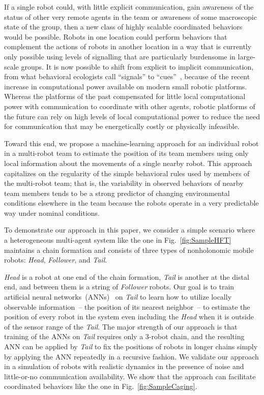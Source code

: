 \documentclass[letterpaper, 10 pt, conference]{ieeeconf}  %
\begin{document}
	If a single robot could, with little explicit communication, gain
	awareness of the status of other very remote agents in the team or
	awareness of some macroscopic state of the group, then a new class of
	highly scalable coordinated behaviors would be possible. Robots in one
	location could perform behaviors that complement the actions of robots
	in another location in a way that is currently only possible using
	levels of signalling that are particularly burdensome in large-scale
	groups. It is now possible to shift from explicit to implicit
	communication, from what behavioral ecologists call ``signals'' to
	``cues''~\cite{BV11}, because of the recent increase in computational
	power available on modern small robotic platforms. Whereas the platforms
	of the past compensated for little local computational power with
	communication to coordinate with other agents, robotic platforms of the
	future can rely on high levels of local computational power to reduce
	the need for communication that may be energetically costly or
	physically infeasible.
	
	Toward this end, we propose a machine-learning approach for an
	individual robot in a multi-robot team to estimate the position of its
	team members using only local information about the movements of a
	single nearby robot. This approach capitalizes on the regularity of the
	simple behavioral rules used by members of the multi-robot team; that
	is, the variability in observed behaviors of nearby team members tends
	to be a strong predictor of changing environmental conditions elsewhere
	in the team because the robots operate in a very predictable way under
	nominal conditions.
	
	To demonstrate our approach in this paper, we consider a simple scenario
	where a heterogeneous multi-agent system like the one in
	Fig.~\ref{fig:SampleHFT} maintains a chain
	formation and consists of three types of nonholonomic mobile robots:
	\emph{Head}, \emph{Follower}, and \emph{Tail}.
	
	\emph{Head} is a robot at one end of the chain formation, \emph{Tail} is
	another at the distal end, and between them is a string of
	\emph{Follower} robots. Our goal is to train artificial neural
	networks~(ANNs)~\cite{Schmidhuber15} on \emph{Tail} to learn how to
	utilize locally observable information~-- the position of its nearest
	neighbor~-- to estimate the position of every robot in the system even
	including the \emph{Head} when it is outside of the sensor range of the
	\emph{Tail}. The major strength of our approach is that training of the
	ANNs on \emph{Tail} requires only a 3-robot chain, and the resulting ANN
	can be applied by \emph{Tail} to fix the positions of robots in longer
	chains simply by applying the ANN repeatedly in a recursive fashion. We
	validate our approach in a simulation of robots with realistic dynamics
	in the presence of noise and little-or-no communication availability. We
	show that the approach can facilitate coordinated behaviors like the
	one in Fig.~\ref{fig:SampleCaging}.
	
\end{document}
